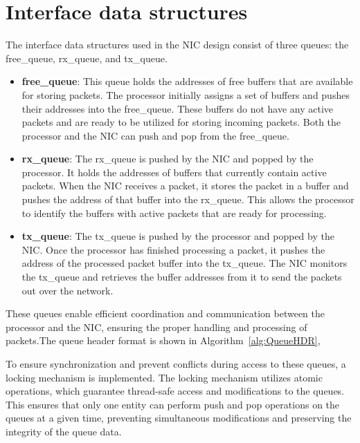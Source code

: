\documentclass[12pt]{report}
\begin{document}
	
	\section{Interface data structures}

		The interface data structures used in the NIC design consist of three queues: the free\_queue, rx\_queue, and tx\_queue.




	\begin{itemize}
		\item \textbf{free\_queue}: This queue holds the addresses of free buffers that are available for storing packets. The processor initially assigns a set of buffers and pushes their addresses into the free\_queue. These buffers do not have any active packets and are ready to be utilized for storing incoming packets. Both the processor and the NIC can push and pop from the free\_queue.\\

		\item \textbf{rx\_queue}: The rx\_queue is pushed by the NIC and popped by the processor. It holds the addresses of buffers that currently contain active packets. When the NIC receives a packet, it stores the packet in a buffer and pushes the address of that buffer into the rx\_queue. This allows the processor to identify the buffers with active packets that are ready for processing.

		\item \textbf{tx\_queue}: The tx\_queue is pushed by the processor and popped by the NIC. Once the processor has finished processing a packet, it pushes the address of the processed packet buffer into the tx\_queue. The NIC monitors the tx\_queue and retrieves the buffer addresses from it to send the packets out over the network.\\
	\end{itemize}

These queues enable efficient coordination and communication between the processor and the NIC, ensuring the proper handling and processing of packets.The queue header format is shown in Algorithm~\ref{alg:QueueHDR},


To ensure synchronization and prevent conflicts during access to these queues, a locking mechanism is implemented. The locking mechanism utilizes atomic operations, which guarantee thread-safe access and modifications to the queues. This ensures that only one entity can perform push and pop operations on the queues at a given time, preventing simultaneous modifications and preserving the integrity of the queue data.
\end{document}
